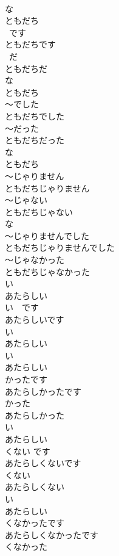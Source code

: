 \documentclass[8pt]{extreport}
\begin{document}
\begin{CJK}{UTF8}{min}
\\	な 
\\	ともだち	
\\	~です 
\\	ともだちです 
\\	~だ 
\\	ともだちだ
\\	な 
\\	ともだち	
\\	～でした 
\\	ともだちでした 
\\	～だった 
\\	ともだちだった
\\	な 
\\	ともだち	
\\	～じゃりません 
\\	ともだちじゃりません 
\\	～じゃない　　 
\\	ともだちじゃない
\\	な 
\\	～じゃりませんでした
\\	ともだちじゃりませんでした 
\\	～じゃなかった 
\\	ともだちじゃなかった
\\	い 
\\	あたらしい	
\\	い　です 
\\	あたらしいです 
\\	い 　　　
\\	あたらしい
\\	い　
\\	あたらしい	
\\	かったです 
\\	あたらしかったです 
\\	かった 
\\	あたらしかった
\\	い 
\\	あたらしい	
\\	くない です 
\\	あたらしくないです 
\\	くない 
\\	あたらしくない
\\	い 
\\	あたらしい	
\\	くなかったです 
\\	あたらしくなかったです 
\\	くなかった 

\end{CJK}
\end{document}
